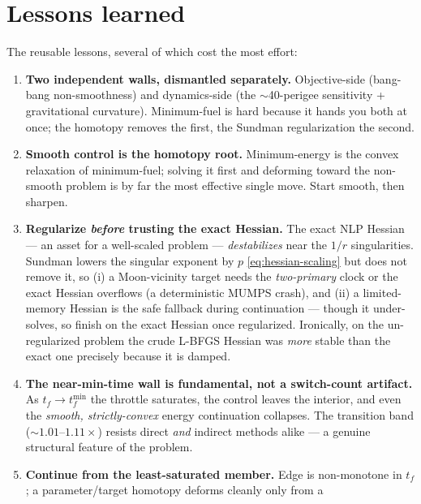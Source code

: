 \documentclass[11pt]{article}
\begin{document}
\section{Lessons learned}\label{sec:lessons}
The reusable lessons, several of which cost the most effort:
\begin{enumerate}
  \item \textbf{Two independent walls, dismantled separately.} Objective-side
        (bang-bang non-smoothness) and dynamics-side (the $\sim$40-perigee
        sensitivity + gravitational curvature). Minimum-fuel is hard because it
        hands you both at once; the homotopy removes the first, the Sundman
        regularization the second.
  \item \textbf{Smooth control is the homotopy root.} Minimum-energy is the
        convex relaxation of minimum-fuel; solving it first and deforming toward
        the non-smooth problem is by far the most effective single move. Start
        smooth, then sharpen.
  \item \textbf{Regularize \emph{before} trusting the exact Hessian.} The exact
        NLP Hessian --- an asset for a well-scaled problem --- \emph{destabilizes}
        near the $1/r$ singularities. Sundman lowers the singular exponent by $p$
        \eqref{eq:hessian-scaling} but does not remove it, so (i) a Moon-vicinity
        target needs the \emph{two-primary} clock or the exact Hessian overflows
        (a deterministic MUMPS crash), and (ii) a limited-memory Hessian is the
        safe fallback during continuation --- though it under-solves, so finish
        on the exact Hessian once regularized. Ironically, on the un-regularized
        problem the crude L-BFGS Hessian was \emph{more} stable than the exact one
        precisely because it is damped.
  \item \textbf{The near-min-time wall is fundamental, not a switch-count
        artifact.} As $t_f\to t_f^{\min}$ the throttle saturates, the control
        leaves the interior, and even the \emph{smooth, strictly-convex} energy
        continuation collapses. The transition band ($\sim1.01$--$1.11\times$)
        resists direct \emph{and} indirect methods alike --- a genuine structural
        feature of the problem.
  \item \textbf{Continue from the least-saturated member.} Edge is non-monotone
        in $t_f$; a parameter/target homotopy deforms cleanly only from a

\end{enumerate}
\end{document}
